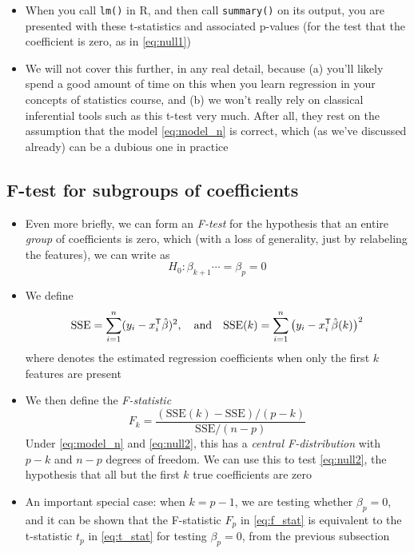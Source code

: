\documentclass{article}
\begin{document}
\begin{itemize}
\item When you call \verb|lm()| in R, and then call \verb|summary()| on its
  output, you are presented with these t-statistics and associated p-values (for
  the test that the coefficient is zero, as in \eqref{eq:null1})

\item We will not cover this further, in any real detail, because (a) you'll
  likely spend a good amount of time on this when you learn regression in your
  concepts of statistics course, and (b) we won't really rely on classical
  inferential tools such as this t-test very much. After all, they rest on the
  assumption that the model \eqref{eq:model_n} is correct, which (as we've
  discussed already) can be a dubious one in practice
\end{itemize}

\subsection{F-test for subgroups of coefficients}

\def\SSE{\mathrm{SSE}}

\begin{itemize}
\item Even more briefly, we can form an \emph{F-test} for the hypothesis that an
  entire \emph{group} of coefficients is zero, which (with a loss of generality,
  just by relabeling the features), we can write as
  \begin{equation}
  \label{eq:null2}
  H_0 : \beta_{k+1} \cdots = \beta_p = 0
  \end{equation}

\item We define
  \[
  \SSE = \sum_{i=1}^n (y_i - x_i^\T \hbeta)^2, \quad \text{and} \quad 
  \SSE(k) = \sum_{i=1}^n \big( y_i - x_i^\T \hbeta(k) \big)^2
  \]
  where  denotes the estimated regression
  coefficients when only the first $k$ features are present

\item We then define the \emph{F-statistic}  
  \begin{equation}
  \label{eq:f_stat}
  F_k = \frac{(\SSE(k) - \SSE) / (p-k)}{\SSE / (n-p)}
  \end{equation}
  Under \eqref{eq:model_n} and \eqref{eq:null2}, this has a \emph{central
    F-distribution} with $p-k$ and $n-p$ degrees of freedom. We can use this to
  test \eqref{eq:null2}, the hypothesis that all but the first $k$ true
  coefficients are zero

\item An important special case: when $k = p-1$, we are testing whether $\beta_p
  = 0$, and it can be shown that the F-statistic $F_p$ in \eqref{eq:f_stat} is
  equivalent to the t-statistic $t_p$ in \eqref{eq:t_stat} for testing $\beta_p
  = 0$, from the previous subsection  
\end{itemize}
\end{document}
